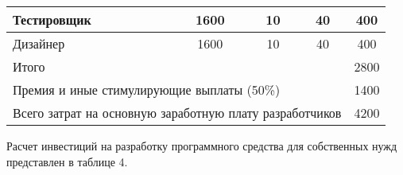 \begin{table}[ht]
\begin{tabular}{|lccc|c|}
    \multicolumn{1}{|l|}{Тестировщик}                                                     & \multicolumn{1}{c|}{1600}                                                         & \multicolumn{1}{c|}{10}                                                          & 40                                                               & 400       \\ \hline
    \multicolumn{1}{|l|}{Дизайнер}                                                        & \multicolumn{1}{c|}{1600}                                                         & \multicolumn{1}{c|}{10}                                                          & 40                                                               & 400       \\ \hline
    \multicolumn{4}{|l|}{Итого}                                                                                                                                                                                                                                                                                                     & 2800      \\ \hline
    \multicolumn{4}{|l|}{Премия и иные стимулирующие выплаты (50\%)}                                                                                                                                                                                                                                                                & 1400      \\ \hline
    \multicolumn{4}{|l|}{Всего затрат на основную заработную плату разработчиков}                                                                                                                                                                                                                                                   & 4200      \\ \hline
    \end{tabular}
\end{table}

Расчет инвестиций на разработку программного средства для собственных нужд 
представлен в таблице 4.

